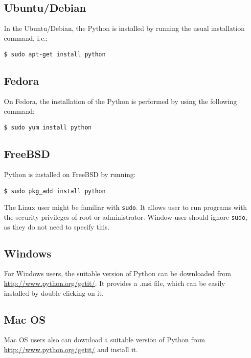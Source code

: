 \documentclass[10pt]{book}
\begin{document}

\subsection{Ubuntu/Debian}
In the Ubuntu/Debian, the Python is installed by running the usual installation command, i.e.:
\beforeverb
\begin{verbatim}
$ sudo apt-get install python
\end{verbatim}
\afterverb


\subsection{Fedora}
On Fedora, the installation of the Python is performed by using the following command:
\beforeverb
\begin{verbatim}
$ sudo yum install python
\end{verbatim}
\afterverb


\subsection{FreeBSD}
Python is installed on FreeBSD by running:
\beforeverb
\begin{verbatim}
$ sudo pkg_add install python
\end{verbatim}
\afterverb
{}

The Linux user might be familiar with \verb"sudo". 
It allows user to run programs with the security privileges of root or administrator. 
Window user should ignore \verb"sudo", as they do not need to specify this. \\

\subsection{Windows}
For Windows users, the suitable version of Python can be downloaded 
from \url{http://www.python.org/getit/}. 
It provides a .msi file, which can be easily installed by double clicking on it. \\

\subsection{Mac OS}
Mac OS users also can download a suitable version of Python from 
\url{http://www.python.org/getit/} and install it.
\end{document}
